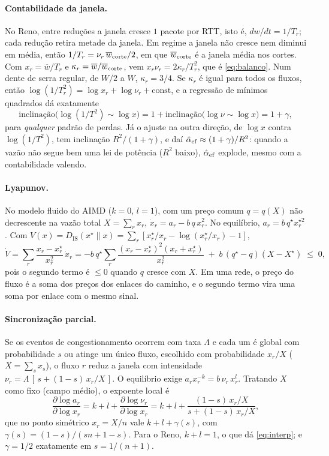 \documentclass[11pt,a4paper]{article}
\newcommand{\Dis}{D_{\mathrm{IS}}}
\begin{document}
\paragraph{Contabilidade da janela.} No Reno, entre reduções a janela cresce
$1$ pacote por RTT, isto é, $dw/dt=1/T_r$; cada redução retira metade da janela. Em
regime a janela não cresce nem diminui em média, então $1/T_r=\nu_r\,\overline{w}_{\rm
corte}/2$, em que $\overline{w}_{\rm corte}$ é a janela média nos cortes. Com
$x_r=\overline{w}/T_r$ e $\kappa_r=\overline{w}/\overline{w}_{\rm corte}$, vem
$x_r\nu_r=2\kappa_r/T_r^2$, que é \eqref{eq:balanco}. Num dente de serra regular, de $W/2$
a $W$, $\kappa_r=3/4$. Se $\kappa_r$ é igual para todos os fluxos, então
$\log(1/T_r^2)=\log x_r+\log\nu_r+\text{const}$, e a regressão de mínimos quadrados dá
exatamente
\[
\text{inclinação}\big(\log(1/T^2)\sim\log x\big)=1+\text{inclinação}\big(\log\nu\sim\log x\big)=1+\gamma ,
\]
para \emph{qualquer} padrão de perdas. Já o ajuste na outra direção, de $\log x$ contra
$\log(1/T^2)$, tem inclinação $R^2/(1+\gamma)$, e daí $\hat\alpha_{\rm ef}\approx(1+\gamma)/R^2$:
quando a vazão não segue bem uma lei de potência ($R^2$ baixo), $\hat\alpha_{\rm ef}$
explode, mesmo com a contabilidade valendo.

\paragraph{Lyapunov.} No modelo fluido do AIMD ($k=0$, $l=1$), com um preço comum
$q=q(X)$ não decrescente na vazão total $X=\sum_r x_r$, $\dot x_r=a_r-b\,q\,x_r^{2}$. No
equilíbrio, $a_r=b\,q^\star x_r^{\star2}$. Com
$V(x)=\Dis(x^\star\|x)=\sum_r[x^\star_r/x_r-\log(x^\star_r/x_r)-1]$,
\[
\dot V=\sum_r\frac{x_r-x^\star_r}{x_r^2}\,\dot x_r
=-b\,q^\star\sum_r\frac{(x_r-x^\star_r)^2(x_r+x^\star_r)}{x_r^2}
\;+\;b\,(q^\star-q)(X-X^\star)\;\le\;0 ,
\]
pois o segundo termo é $\le0$ quando $q$ cresce com $X$. Em uma rede, o preço do fluxo
é a soma dos preços dos enlaces do caminho, e o segundo termo vira uma soma por enlace
com o mesmo sinal.

\paragraph{Sincronização parcial.} Se os eventos de congestionamento ocorrem com taxa
$\Lambda$ e cada um é global com probabilidade $s$ ou atinge um único fluxo, escolhido
com probabilidade $x_r/X$ ($X=\sum_s x_s$), o fluxo $r$ reduz a janela com intensidade
$\nu_r=\Lambda\,[\,s+(1-s)\,x_r/X\,]$. O equilíbrio exige $a_r x_r^{-k}=b\,\nu_r\,x_r^{l}$.
Tratando $X$ como fixo (campo médio), o expoente local é
\[
\frac{\partial\log a_r}{\partial\log x_r}=k+l+\frac{\partial\log\nu_r}{\partial\log x_r}
=k+l+\frac{(1-s)\,x_r/X}{s+(1-s)\,x_r/X},
\]
que no ponto simétrico $x_r=X/n$ vale $k+l+\gamma(s)$, com
$\gamma(s)=(1-s)/(sn+1-s)$. Para o Reno, $k+l=1$, o que dá \eqref{eq:interp}; e
$\gamma=1/2$ exatamente em $s=1/(n+1)$.
\end{document}
